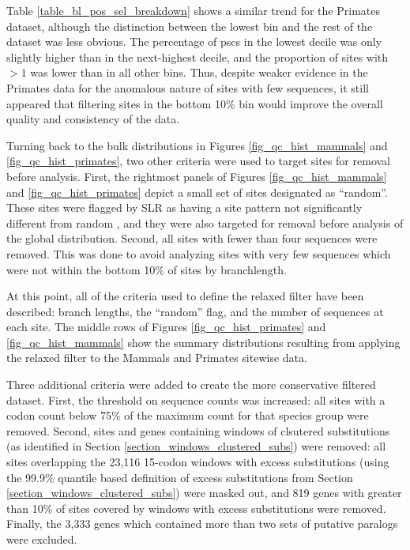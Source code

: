 Table \ref{table_bl_pos_sel_breakdown} shows a similar trend for the
Primates dataset, although the distinction between the lowest bin and
the rest of the dataset was less obvious. The percentage of \acp{psc}
in the lowest decile was only slightly higher than in the next-highest
decile, and the proportion of sites with \omgml$>1$ was lower than in
all other bins. Thus, despite weaker evidence in the Primates data for
the anomalous nature of sites with few \ngap sequences, it still
appeared that filtering sites in the bottom 10\% bin would improve the
overall quality and consistency of the data.

Turning back to the bulk distributions in Figures
\ref{fig_qc_hist_mammals} and \ref{fig_qc_hist_primates}, two other
criteria were used to target sites for removal before analysis. First,
the rightmost panels of Figures \ref{fig_qc_hist_mammals} and
\ref{fig_qc_hist_primates} depict a small set of sites designated as
``random''. These sites were flagged by SLR as having a site pattern
not significantly different from random \citep{Massingham2005}, and
they were also targeted for removal before analysis of the global
distribution. Second, all sites with fewer than four \ngap sequences
were removed. This was done to avoid analyzing sites with very few
sequences which were not within the bottom 10\% of sites by \ngap
branchlength.

At this point, all of the criteria used to define the relaxed filter
have been described: \ngap branch lengths, the ``random'' flag, and
the number of \ngap sequences at each site.
The middle rows of Figures \ref{fig_qc_hist_primates} and
\ref{fig_qc_hist_mammals} show the summary distributions resulting
from applying the relaxed filter to the Mammals and Primates sitewise
data.

Three additional criteria were added to create the more conservative
filtered dataset. First, the threshold on \ngap sequence counts was
increased: all sites with a \ngap codon count below 75\% of the
maximum \ngap count for that species group were removed. Second, sites
and genes containing windows of clsutered \nsyn substitutions (as
identified in Section \ref{section_windows_clustered_subs}) were
removed: all sites overlapping the 23,116 15-codon windows with excess
\nsyn substitutions (using the 99.9\% quantile based definition of
excess substitutions from Section
\ref{section_windows_clustered_subs}) were masked out, and 819 genes
with greater than 10\% of sites covered by windows with excess \nsyn
substitutions were removed. Finally, the 3,333 genes which contained
more than two sets of putative paralogs were excluded.

